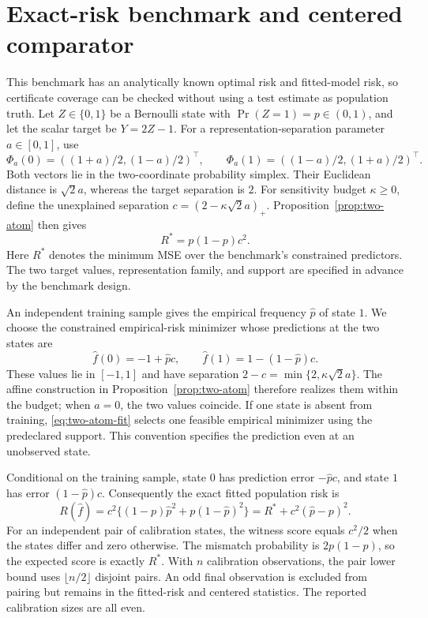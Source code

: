 \section{Exact-risk benchmark and centered comparator}
\label{app:known-risk}

This benchmark has an analytically known optimal risk and fitted-model risk,
so certificate coverage can be checked without using a test estimate as
population truth. Let $Z\in\{0,1\}$ be a Bernoulli state with
$\Pr(Z=1)=p\in(0,1)$, and let the scalar target be $Y=2Z-1$.
For a representation-separation parameter $a\in[0,1]$, use
\[
 \Phi_a(0)=\left((1+a)/2,(1-a)/2\right)^\top,\qquad
 \Phi_a(1)=\left((1-a)/2,(1+a)/2\right)^\top.
\]
Both vectors lie in the two-coordinate probability simplex. Their Euclidean
distance is $\sqrt2a$, whereas the target separation is $2$. For sensitivity
budget $\kappa\geq0$, define the unexplained separation
$c=(2-\kappa\sqrt2a)_+$. Proposition~\ref{prop:two-atom} then gives
\[
 R^*=p(1-p)c^2.
\]
Here $R^*$ denotes the minimum MSE over the benchmark's constrained
predictors. The two target values, representation family, and support are
specified in advance by the benchmark design.

An independent training sample gives the empirical frequency
$\widehat p$ of state $1$. We choose the constrained empirical-risk
minimizer whose predictions at the two states are
\begin{equation}
 \widehat f(0)=-1+\widehat p c,
 \qquad
 \widehat f(1)=1-(1-\widehat p)c.
 \label{eq:two-atom-fit}
\end{equation}
These values lie in $[-1,1]$ and have separation
$2-c=\min\{2,\kappa\sqrt2a\}$. The affine construction in
Proposition~\ref{prop:two-atom} therefore realizes them within the budget;
when $a=0$, the two values coincide. If one state is absent from training,
\eqref{eq:two-atom-fit} selects one feasible empirical minimizer using the
predeclared support. This convention specifies the prediction even at an
unobserved state.

Conditional on the training sample, state $0$ has prediction error
$-\widehat p c$, and state $1$ has error $(1-\widehat p)c$.
Consequently the exact fitted population risk is
\begin{equation}
 R(\widehat f)
 =c^2\{(1-p)\widehat p^2+p(1-\widehat p)^2\}
 =R^*+c^2(\widehat p-p)^2.
 \label{eq:two-atom-fitted-risk}
\end{equation}
For an independent pair of calibration states, the witness score equals
$c^2/2$ when the states differ and zero otherwise. The mismatch probability
is $2p(1-p)$, so the expected score is exactly $R^*$. With $n$ calibration
observations, the pair lower bound uses $\lfloor n/2\rfloor$ disjoint
pairs. An odd final observation is excluded from pairing but remains in the
fitted-risk and centered statistics. The reported calibration sizes are all
even.

